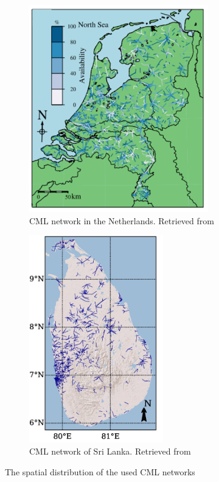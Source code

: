 \documentclass[twocolumn, 10pt, a4paper]{article}
\begin{document}
	
	\begin{figure}[h]
		\hspace*{\fill}
		\begin{subfigure}[h]{0.45\textwidth}
			\includegraphics[height= 9cm]{Dutch_CML_network}
			\caption{CML network in the Netherlands. Retrieved from }
		\end{subfigure}
		\hfill%
		\begin{subfigure}[h]{0.45\textwidth}
			\includegraphics[height=9cm]{SriLanka_CML_network}
			\caption{CML network of Sri Lanka. Retrieved from }
		\end{subfigure}
		\hspace*{\fill}
		\caption{The spatial distribution of the used CML networks}
		\label{fig:cmlnetworkmaps}
	\end{figure}
	
\end{document}
